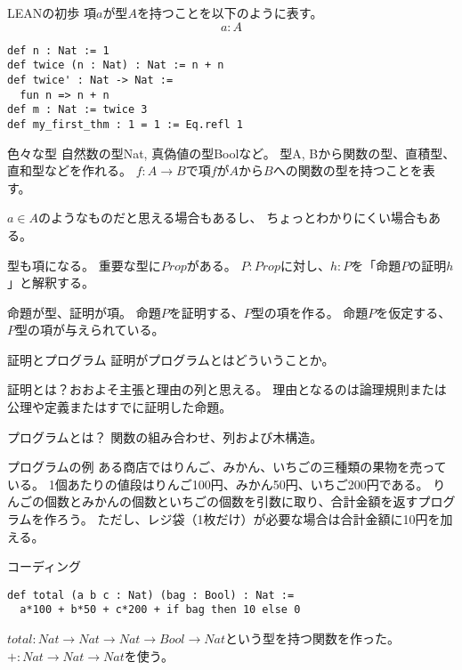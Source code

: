 \documentclass[unicode,12pt]{beamer}%
\begin{document}
\begin{frame}[fragile]{LEANの初歩}
  項$a$が型$A$を持つことを以下のように表す。
  $$
  a:A
  $$

  \begin{tcolorbox}[title=Intro.lean]
  \setlength{\baselineskip}{12pt}
  \begin{verbatim}
def n : Nat := 1
def twice (n : Nat) : Nat := n + n
def twice' : Nat -> Nat :=
  fun n => n + n
def m : Nat := twice 3
def my_first_thm : 1 = 1 := Eq.refl 1
  \end{verbatim}
  \end{tcolorbox}  
\end{frame}

\begin{frame}{色々な型}
  自然数の型Nat, 真偽値の型Boolなど。
  型A, Bから関数の型、直積型、直和型などを作れる。
  $f:A\to B$で項$f$が$A$から$B$への関数の型を持つことを表す。

  $a\in A$のようなものだと思える場合もあるし、
  ちょっとわかりにくい場合もある。
  
  型も項になる。
  重要な型に$Prop$がある。
  $P:Prop$に対し、$h:P$を「命題$P$の証明$h$」と解釈する。

  命題が型、証明が項。
  命題$P$を証明する、$P$型の項を作る。
  命題$P$を仮定する、$P$型の項が与えられている。
\end{frame}

\begin{frame}{証明とプログラム}
  証明がプログラムとはどういうことか。

  証明とは？おおよそ主張と理由の列と思える。
  理由となるのは論理規則または公理や定義またはすでに証明した命題。

  プログラムとは？
  関数の組み合わせ、列および木構造。
\end{frame}

\begin{frame}{プログラムの例}
  ある商店ではりんご、みかん、いちごの三種類の果物を売っている。
  1個あたりの値段はりんご100円、みかん50円、いちご200円である。
  りんごの個数とみかんの個数といちごの個数を引数に取り、合計金額を返すプログラムを作ろう。
  ただし、レジ袋（1枚だけ）が必要な場合は合計金額に10円を加える。
\end{frame}

\begin{frame}[fragile]{コーディング}
  \begin{tcolorbox}[title=Intro.lean]
  \setlength{\baselineskip}{12pt}
  \begin{verbatim}
def total (a b c : Nat) (bag : Bool) : Nat :=
  a*100 + b*50 + c*200 + if bag then 10 else 0
  \end{verbatim}
  \end{tcolorbox}

  $total : Nat \to Nat \to Nat \to Bool \to Nat$という型を持つ関数を作った。
  $+: Nat \to Nat \to Nat$を使う。
\end{frame}
\end{document}
